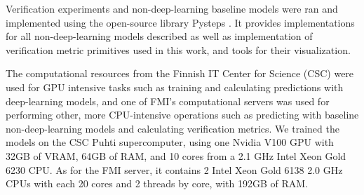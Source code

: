 Verification experiments and non-deep-learning baseline models were ran and implemented using the open-source library Pysteps \cite{pulkkinen_pysteps_2019}. It provides implementations for all non-deep-learning models described as well as implementation of verification metric primitives used in this work, and tools for their visualization. 

The computational resources from the Finnish IT Center for Science (CSC) were used for GPU intensive tasks such as training and calculating predictions with deep-learning models, and one of FMI's computational servers was used for performing other, more CPU-intensive operations such as predicting with baseline non-deep-learning models and calculating verification metrics. We trained the models on the CSC Puhti supercomputer, using one Nvidia V100 GPU with 32GB of VRAM, 64GB of RAM, and 10 cores from a 2.1 GHz Intel Xeon Gold 6230 CPU. As for the FMI server, it contains 2 Intel Xeon Gold 6138 2.0 GHz CPUs with each 20 cores and 2 threads by core, with 192GB of RAM. 
